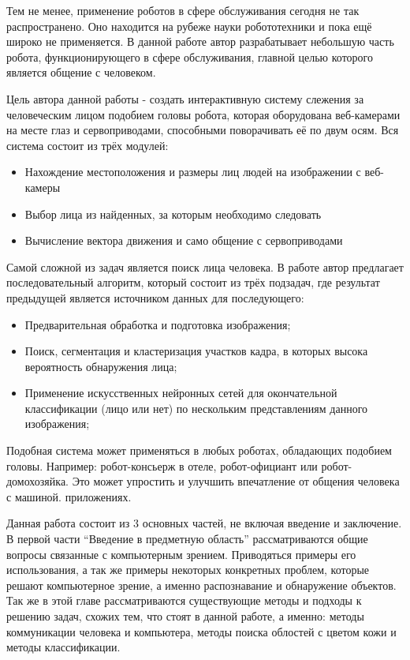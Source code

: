 \documentclass[12pt]{report}
\newenvironment{myItemize}{
 	\vspace{-10pt}
	\begin{itemize}[nolistsep]
}{\end{itemize}}
\begin{document}
Тем не менее, применение роботов в сфере обслуживания сегодня не так распространено. Оно находится на рубеже науки 
робототехники и пока ещё широко не применяется. В данной работе автор разрабатывает небольшую
часть робота, функционирующего в сфере обслуживания, главной целью которого
является общение с человеком. 

Цель автора данной работы - создать интерактивную систему слежения за человеческим лицом подобием головы робота, 
которая оборудована веб-камерами на месте глаз и сервоприводами, способными поворачивать её по двум осям. Вся 
система состоит из трёх модулей:
\begin{myItemize}
\item Нахождение местоположения и размеры лиц людей на изображении с веб-камеры
\item Выбор лица из найденных, за которым необходимо следовать
\item Вычисление вектора движения и само общение с сервоприводами
\end{myItemize}

Самой сложной из задач является поиск лица человека. В работе автор предлагает последовательный алгоритм, 
который состоит из трёх подзадач, где результат предыдущей является источником данных для последующего:
\begin{myItemize}
\item Предварительная обработка и подготовка изображения;
\item Поиск, сегментация и кластеризация участков кадра, в которых высока вероятность обнаружения лица;
\item Применение искусственных нейронных сетей для окончательной классификации (лицо или нет) по нескольким 
представлениям данного изображения;
\end{myItemize}



Подобная система может применяться в любых роботах, обладающих подобием головы.
Например: робот-консьерж в отеле, робот-официант или робот-домохозяйка. Это может упростить и улучшить
впечатление от общения человека с машиной. 
приложениях.

Данная работа состоит из 3 основных частей, не включая введение и заключение. В первой части ``Введение в 
предметную область'' рассматриваются общие вопросы связанные с компьютерным зрением. Приводяться примеры его 
использования, а так же примеры некоторых конкретных проблем, которые решают компьютерное зрение, а именно 
распознавание и обнаружение объектов. Так же в этой главе рассматриваются существующие методы и подходы к решению 
задач, схожих тем, что стоят в данной работе, а именно: методы коммуникации человека и компьютера, методы поиска 
облостей с цветом кожи и методы классификации. 
\end{document}
